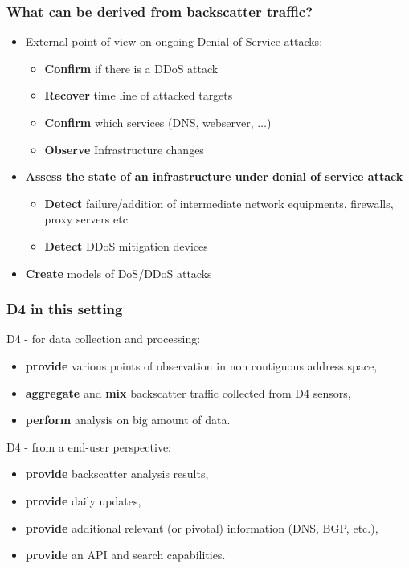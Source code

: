 \documentclass{beamer}
\begin{document}
\begin{frame}
\frametitle{What can be derived from backscatter traffic?}

\begin{itemize}
    \item External point of view on ongoing Denial of Service attacks:
\begin{itemize}
    \item {\bf Confirm} if there is a DDoS attack
    \item {\bf Recover} time line of attacked targets
    \item {\bf Confirm} which services (DNS, webserver, $\dots$)
    \item {\bf Observe} Infrastructure changes
\end{itemize}
    \item {\bf Assess the state of an infrastructure under denial of service attack}
    \begin{itemize}
        \item {\bf Detect} failure/addition of  intermediate network equipments, firewalls, proxy servers etc
        \item {\bf Detect} DDoS mitigation devices
    \end{itemize}
    \item {\bf Create} models of DoS/DDoS attacks
\end{itemize}
\end{frame}

\begin{frame}
        \frametitle{D4 in this setting}

        
        D4 - for data collection and processing:
        \begin{itemize}
          \item {\bf provide} various points of observation in non contiguous address space,
          \item {\bf aggregate} and {\bf mix} backscatter traffic collected from D4 sensors,
          \item {\bf perform} analysis on big amount of data.
        \end{itemize}

        D4 - from a end-user perspective:
        \begin{itemize}
        \item {\bf provide} backscatter analysis results,
        \item {\bf provide} daily updates,
        \item {\bf provide} additional relevant (or pivotal) information (DNS, BGP, etc.),
        \item {\bf provide} an API and search capabilities.
        \end{itemize}

\end{frame}
\end{document}
